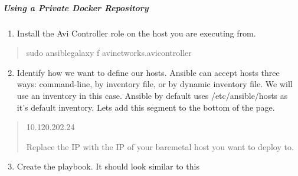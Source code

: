 \documentclass[letterpaper,10pt,english]{sphinxmanual}
\begin{document}
\subparagraph{Using a Private Docker Repository}
\label{\detokenize{integrations/ansible/controller:using-a-private-docker-repository}}
\begin{enumerate}
\item {} 
Install the Avi Controller role on the host you are executing from.

\end{enumerate}
\begin{quote}

\begin{sphinxVerbatim}[commandchars=\\\{\}]
sudo ansible\PYGZhy{}galaxy \PYGZhy{}f avinetworks.avicontroller
\end{sphinxVerbatim}
\end{quote}
\begin{enumerate}
\setcounter{enumi}{1}
\item {} 
Identify how we want to define our hosts. Ansible can accept hosts three ways: command-line, by inventory file, or by dynamic inventory file. We will use an inventory in this case. Ansible by default uses /etc/ansible/hosts as it's default inventory. Lets add this segment to the bottom of the page.

\end{enumerate}
\begin{quote}

\begin{sphinxVerbatim}[commandchars=\\\{\}]
[avicontrollers]
10.120.202.24
\end{sphinxVerbatim}

Replace the IP with the IP of your baremetal host you want to deploy to.
\end{quote}
\begin{enumerate}
\setcounter{enumi}{2}
\item {} 
Create the playbook. It should look similar to this

\end{enumerate}
\end{document}
